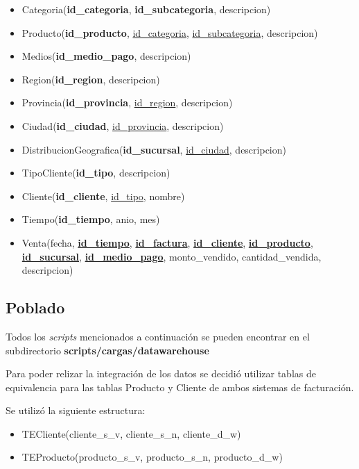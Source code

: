 \begin{itemize}
    \item Categoria(\textbf{id\_categoria}, \textbf{id\_subcategoria}, descripcion)
    \item Producto(\textbf{id\_producto}, \underline{id\_categoria}, \underline{id\_subcategoria}, descripcion)
    \item Medios(\textbf{id\_medio\_pago}, descripcion)
    \item Region(\textbf{id\_region}, descripcion)
    \item Provincia(\textbf{id\_provincia}, \underline{id\_region}, descripcion)
    \item Ciudad(\textbf{id\_ciudad}, \underline{id\_provincia}, descripcion)
    \item DistribucionGeografica(\textbf{id\_sucursal}, \underline{id\_ciudad}, descripcion)
    \item TipoCliente(\textbf{id\_tipo}, descripcion)
    \item Cliente(\textbf{id\_cliente}, \underline{id\_tipo}, nombre)
    \item Tiempo(\textbf{id\_tiempo}, anio, mes)
    \item Venta(fecha, \underline{\textbf{id\_tiempo}}, \underline{\textbf{id\_factura}}, \underline{\textbf{id\_cliente}}, \underline{\textbf{id\_producto}}, \underline{\textbf{id\_sucursal}}, \underline{\textbf{id\_medio\_pago}}, monto\_vendido, cantidad\_vendida, descripcion)
\end{itemize}

\subsection{Poblado}

Todos los \emph{scripts} mencionados a continuación se pueden encontrar en el subdirectorio \textbf{scripts/cargas/datawarehouse}

Para poder relizar la integración de los datos se decidió utilizar tablas de equivalencia para las tablas Producto y Cliente de ambos sistemas de facturación.

Se utilizó la siguiente estructura:

\begin{itemize}
    \item TECliente(cliente\_s\_v, cliente\_s\_n, cliente\_d\_w)
    \item TEProducto(producto\_s\_v, producto\_s\_n, producto\_d\_w)
\end{itemize}

